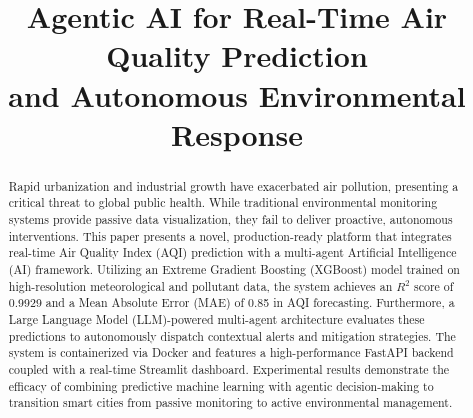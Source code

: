 \documentclass[conference]{IEEEtran}
\begin{document}
\title{Agentic AI for Real-Time Air Quality Prediction\\
and Autonomous Environmental Response}


\author{

\and
{}

\IEEEauthorblockA{\hspace{7cm}} %

\and
{}


}
\maketitle


\begin{abstract}
Rapid urbanization and industrial growth have exacerbated air pollution, presenting a critical threat to global public health. While traditional environmental monitoring systems provide passive data visualization, they fail to deliver proactive, autonomous interventions. This paper presents a novel, production-ready platform that integrates real-time Air Quality Index (AQI) prediction with a multi-agent Artificial Intelligence (AI) framework. Utilizing an Extreme Gradient Boosting (XGBoost) model trained on high-resolution meteorological and pollutant data, the system achieves an $R^2$ score of 0.9929 and a Mean Absolute Error (MAE) of 0.85 in AQI forecasting. Furthermore, a Large Language Model (LLM)-powered multi-agent architecture evaluates these predictions to autonomously dispatch contextual alerts and mitigation strategies. The system is containerized via Docker and features a high-performance FastAPI backend coupled with a real-time Streamlit dashboard. Experimental results demonstrate the efficacy of combining predictive machine learning with agentic decision-making to transition smart cities from passive monitoring to active environmental management.
\end{abstract}
\end{document}
